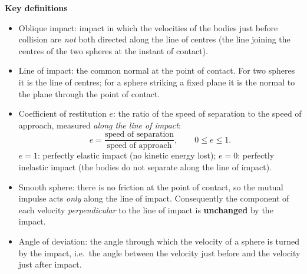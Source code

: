 \documentclass[11pt]{article}
\newcommand{\cle}[1]{{\popxbold\color{popdark}#1}}
\begin{document}
\begin{bilan}
\textbf{Key definitions}
\begin{itemize}
\item \cle{Oblique impact}: impact in which the velocities of the bodies just before collision are \emph{not} both directed along the \cle{line of centres} (the line joining the centres of the two spheres at the instant of contact).
\item \cle{Line of impact}: the common normal at the point of contact. For two spheres it is the line of centres; for a sphere striking a fixed plane it is the normal to the plane through the point of contact.
\item \cle{Coefficient of restitution} $e$: the ratio of the speed of separation to the speed of approach, measured \emph{along the line of impact}:
\[ e=\frac{\text{speed of separation}}{\text{speed of approach}},\qquad 0\le e\le 1. \]
$e=1$: perfectly elastic impact (no kinetic energy lost); $e=0$: perfectly inelastic impact (the bodies do not separate along the line of impact).
\item \cle{Smooth sphere}: there is no friction at the point of contact, so the mutual impulse acts \emph{only} along the line of impact. Consequently the component of each velocity \emph{perpendicular} to the line of impact is \textbf{unchanged} by the impact.
\item \cle{Angle of deviation}: the angle through which the velocity of a sphere is turned by the impact, i.e.\ the angle between the velocity just before and the velocity just after impact.
\end{itemize}


\end{bilan}
\end{document}
